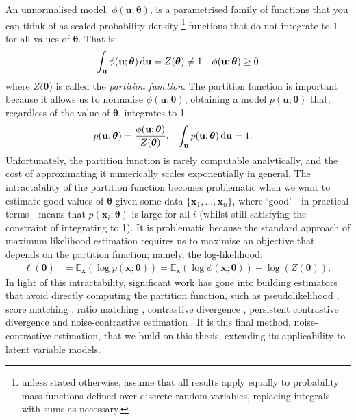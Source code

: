 \documentclass[11pt, oneside]{article}
\newcommand{\thetab}{{\boldsymbol{\theta}}}
\newcommand{\pnorm}{p}
\newcommand{\pnn}{\phi}
\renewcommand{\u}{{\mathbf u}}
\newcommand{\x}{{\mathbf x}}
\newcommand{\E}{\mathbb{E}}
\newcommand{\Ex}{\E_{\x}}
\begin{document}
An unnormalised model, $\pnn(\u;\thetab)$, is a parametrised family of functions that you can think of as scaled probability density \footnote{unless stated otherwise, assume that all results apply equally to probability mass functions defined over discrete random variables, replacing integrals with sums as necessary.} functions that do not integrate to 1 for all values of $\thetab$. That is:
 \begin{align}
   \int_{\u }\pnn(\u;\thetab) \dif \u &= Z(\thetab) \neq 1 & \pnn(\u;\thetab) \geq 0
\label{eq:Zdef}
  \end{align}
where $Z(\thetab$) is called the \emph{partition function}. The partition function is important because it allows us to normalise $\pnn(\u;\thetab)$, obtaining a model $\pnorm(\u; \thetab)$ that, regardless of the value of $\thetab$, integrates to 1.
\begin{align}
  \pnorm(\u;\thetab)&=\frac{\pnn(\u;\thetab)}{Z(\thetab)}, & \int_{\u }\pnorm(\u;\thetab) \dif\u & = 1.
  \label{unnormalised density}
\end{align}
Unfortunately, the partition function is rarely computable analytically, and the cost of approximating it numerically scales exponentially in general. The intractability of the partition function becomes problematic when we want to estimate good values of $\thetab$ given some data $\{\x_1, ..., \x_n\}$, where `good' - in practical terms - means that  $\pnorm(\x_i; \thetab)$ is large for all $i$ (whilst still satisfying the constraint of integrating to 1). It is problematic because the standard approach of maximum likelihood estimation requires us to maximise an objective that depends on the partition function; namely, the log-likelihood:
\begin{align}
\ell(\thetab) &= \Ex \left( \log \pnorm(\x;\thetab) \right) = \Ex \left( \log \pnn(\x;\thetab) \right) - \log ( Z(\thetab) ),
\label{eq:log-likelihood}
\end{align}
In light of this intractability, significant work has gone into building estimators that avoid directly computing the partition function, such as pseudolikelihood \citep{besag1975statistical}, score matching \citep{hyvarinen2005estimation}, ratio matching \citep{hyvarinen2007some}, contrastive divergence \citep{hinton2006training}, persistent contrastive divergence \citep{younes1998stochastic, tieleman2009using} and noise-contrastive estimation \citep{gutmann2012noise}. It is this final method, noise-contrastive estimation, that we build on this thesis, extending its applicability to latent variable models. 
\end{document}

